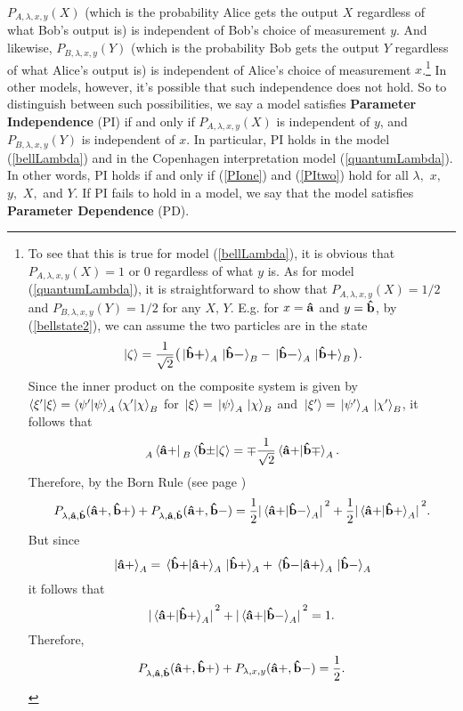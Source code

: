 $P_{A,\lambda,x,y}(X)$ (which is the probability Alice gets the output $X$ regardless of what Bob's output is) is independent of Bob's choice of measurement $y$. And likewise, $P_{B,\lambda,x,y}(Y)$ (which is the probability Bob gets the output $Y$ regardless of what Alice's output is) is independent of Alice's choice of measurement $x$.\footnote{To see that this is true for model (\ref{bellLambda}), it is obvious that $P_{A, \lambda,x,y}(X)=1$ or 0 regardless of what $y$ is. As for model (\ref{quantumLambda}), it is straightforward to show\label{onehalf} that $P_{A, \lambda,x,y}(X)=1/2$ and $P_{B,\lambda,x,y}(Y)=1/2$ for any $X,\, Y$. E.g. for $x=\vb{\hat{a}}$ and $y=\vb{\hat{b}}$, by (\ref{bellstate2}), we can assume the two particles are in the state 
$$\ket*{\zeta}=\frac{1}{\sqrt{2}}\big(\ket*{{\vb{\hat{{b}}}\bm{+}}}_A\ket*{{\vb{\hat{{b}}}\bm{-}}}_B-\ket*{{\vb{\hat{{b}}}\bm{-}}}_A\ket*{{\vb{\hat{{b}}}\bm{+}}}_B\big).$$
Since the inner product on the composite system is given by  $\ip{\xi'}{\xi}=\ip{\psi'}{\psi}_A\ip{\chi'}{\chi}_B$ for $\ket*{\xi}=\ket*{\psi}_A\ket*{\chi}_B$ and $\ket*{\xi'}=\ket*{\psi'}_A\ket*{\chi'}_B$, it follows that 
$$\prescript{}{A}{ \bra*{\vb{\hat{a}+}}}\prescript{}{B}{\ip*{\vb{\hat{b}\pm}}{\zeta}}=\mp\frac{1}{\sqrt{2}}\ip*{\vb{\hat{a}+}}{\vb{\hat{b}\mp}}_A.$$ 
Therefore, by the Born Rule (see page \pageref{bornrule})
$$P_{\lambda,\vb{\hat{a}},\vb{\hat{b}}}(\vb{\hat{a}+}, \vb{\hat{b}+})+P_{\lambda,\vb{\hat{a}},\vb{\hat{b}}}(\vb{\hat{a}+},\vb{\hat{b}-})=\frac{1}{2}\abs*{\ip*{\vb{\hat{a}+}}{\vb{\hat{b}-}}_A}^2+\frac{1}{2}\abs*{\ip*{\vb{\hat{a}+}}{\vb{\hat{b}+}}_A}^2.$$
But since
$$\ket*{\vb{\hat{a}+}}_A=\ip*{\vb{\hat{b}+}}{\vb{\hat{a}+}}_A\ket*{\vb{\hat{b}+}}_A+\ip*{\vb{\hat{b}-}}{\vb{\hat{a}+}}_A\ket*{\vb{\hat{b}-}}_A$$
it follows that 
$$\abs*{\ip*{\vb{\hat{a}+}}{\vb{\hat{b}+}}_A}^2+\abs*{\ip*{\vb{\hat{a}+}}{\vb{\hat{b}-}}_A}^2 =1. $$
Therefore, 
$$P_{\lambda,\vb{\hat{a}},\vb{\hat{b}}}(\vb{\hat{a}+}, \vb{\hat{b}+})+P_{\lambda,x,y}(\vb{\hat{a}+},\vb{\hat{b}-})=\frac{1}{2}.$$
 } In other models, however, it's possible that such independence does not hold. So to distinguish between such possibilities, we say a model satisfies \textbf{Parameter Independence} (PI) \label{PIdef} if and only if $P_{A,\lambda,x,y}(X)$ is independent of $y$, and $P_{B,\lambda,x,y}(Y)$ is independent of $x$. In particular, PI holds in the model (\ref{bellLambda}) and in the Copenhagen interpretation model (\ref{quantumLambda}). In other words, PI holds if and only if (\ref{PIone}) and (\ref{PItwo}) hold for all $\lambda,$ $x,$ $y,$ $X,$ and $Y$. If PI fails to hold in a model, we say that the model satisfies \textbf{Parameter Dependence} (PD). %
%
